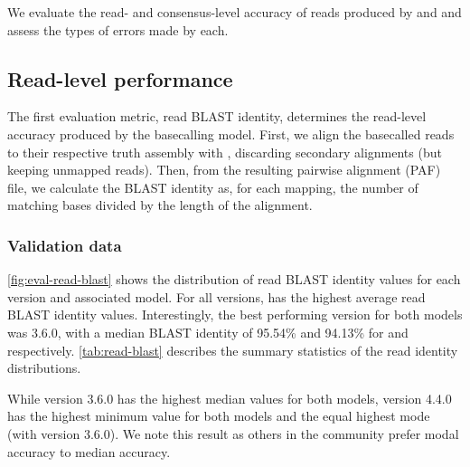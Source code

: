 We evaluate the read- and consensus-level accuracy of reads produced by \guppy{} and \tubby{} and assess the types of errors made by each. 

\subsection{Read-level performance}
\label{sec:tubby-read}

The first evaluation metric, read BLAST identity, determines the read-level accuracy produced by the basecalling model. First, we align the basecalled reads to their respective truth assembly with , discarding secondary alignments (but keeping unmapped reads). Then, from the resulting pairwise alignment (PAF) file, we calculate the BLAST identity as, for each mapping, the number of matching bases divided by the length of the alignment. 

\subsubsection{Validation data}

\autoref{fig:eval-read-blast} shows the distribution of read BLAST identity values for each \guppy{} version and associated \tubby{} model. For all versions, \tubby{} has the highest average read BLAST identity values. Interestingly, the best performing version for both models was 3.6.0, with a median BLAST identity of 95.54\% and 94.13\% for \tubby{} and \guppy{} respectively. \autoref{tab:read-blast} describes the summary statistics of the read identity distributions.

While version 3.6.0 has the highest median values for both models, version 4.4.0 has the highest minimum value for both models and the equal highest mode (with \tubby{} version 3.6.0). We note this result as others in the \ont{} community prefer modal accuracy to median accuracy.

